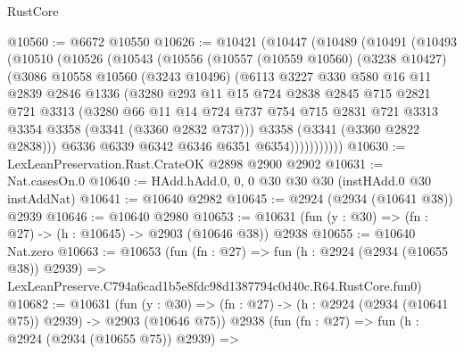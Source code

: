 \begin{lexlean}{RustCore}
\begin{coremodule}
@10560 := @6672 @10550
@10626 := @10421
    (@10447
      (@10489
        (@10491
          (@10493
            (@10510
              (@10526
                (@10543
                  (@10556
                    (@10557
                      (@10559 @10560)
                      (@3238 @10427)
                      (@3086
                        @10558
                        @10560
                        (@3243 @10496)
                        (@6113
                          @3227
                          @330
                          @580
                          @16
                          @11
                          @2839
                          @2846
                          @1336
                          (@3280
                            @293
                            @11
                            @15
                            @724
                            @2838
                            @2845
                            @715
                            @2821
                            @721
                            @3313
                            (@3280
                              @66
                              @11
                              @14
                              @724
                              @737
                              @754
                              @715
                              @2831
                              @721
                              @3313
                              @3354
                              @3358
                              (@3341 (@3360 @2832 @737)))
                            @3358
                            (@3341 (@3360 @2822 @2838)))
                          @6336
                          @6339
                          @6342
                          @6346
                          @6351
                          @6354)))))))))))
@10630 := LexLeanPreservation.Rust.CrateOK @2898 @2900 @2902
@10631 := Nat.casesOn.{0}
@10640 := HAdd.hAdd.{0, 0, 0} @30 @30 @30 (instHAdd.{0} @30 instAddNat)
@10641 := @10640 @2982
@10645 := @2924 (@2934 (@10641 @38)) @2939
@10646 := @10640 @2980
@10653 := @10631 (fun (y : @30) => (fn : @27) -> (h : @10645) -> @2903 (@10646 @38)) @2938
@10655 := @10640 Nat.zero
@10663 := @10653
    (fun (fn : @27) =>
    fun (h : @2924 (@2934 (@10655 @38)) @2939) =>
    LexLeanPreserve.C794a6cad1b5e8fdc98d1387794c0d40c.R64.RustCore.fun0)
@10682 := @10631
    (fun (y : @30) => (fn : @27) -> (h : @2924 (@2934 (@10641 @75)) @2939) -> @2903 (@10646 @75))
    @2938
    (fun (fn : @27) =>
    fun (h : @2924 (@2934 (@10655 @75)) @2939) =>

\end{coremodule}
\end{lexlean}
